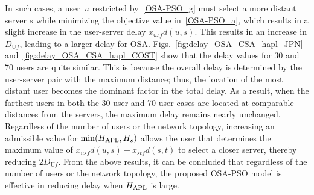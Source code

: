 \documentclass[conference]{IEEEtran}
\begin{document}
\begin{CJK}{UTF8}{ipxm}
In such cases, a user~$u$ restricted by~\eqref{OSA-PSO_g} must select a more distant server $s$ while minimizing the objective value in~\eqref{OSA-PSO_a}, which results in a slight increase in the user-server delay $x_{usf}d(u,s)$.
This results in an increase in $D_{\mathrm{U}f}$, leading to a larger delay for OSA.
Figs.~\ref{fig:delay_OSA_CSA_hapl_JPN} and~\ref{fig:delay_OSA_CSA_hapl_COST} show that the delay values for 30 and 70 users are quite similar.
This is because the overall delay is determined by the user-server pair with the maximum distance; thus, the location of the most distant user becomes the dominant factor in the total delay.
As a result, when the farthest users in both the 30-user and 70-user cases are located at comparable distances from the servers, the maximum delay remains nearly unchanged.
Regardless of the number of users or the network topology, increasing an admissible value for $\min(H_{\rm APL}, H_s)$ allows the user that determines the maximum value of $x_{usf}d(u,s) + x_{stf}d(s,t)$ to select a closer server, thereby reducing $2D_{\mathrm{U}f}$.
From the above results, it can be concluded that regardless of the number of users or the network topology, the proposed OSA-PSO model is effective in reducing delay when $H_{\rm APL}$ is large.


\end{CJK}
\end{document}
